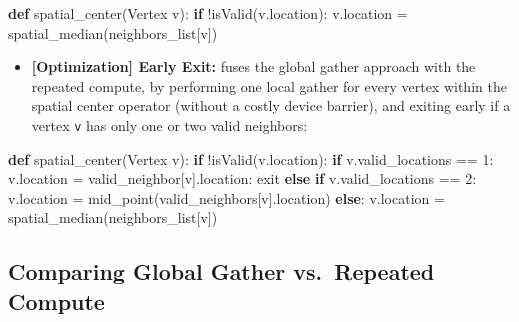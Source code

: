 \documentclass[10pt,oneside]{memoir}
\newenvironment{Shaded}{}{}
\newcommand{\ControlFlowTok}[1]{\textcolor[rgb]{0.00,0.44,0.13}{\textbf{#1}}}
\newcommand{\DecValTok}[1]{\textcolor[rgb]{0.25,0.63,0.44}{#1}}
\newcommand{\KeywordTok}[1]{\textcolor[rgb]{0.00,0.44,0.13}{\textbf{#1}}}
\newcommand{\NormalTok}[1]{#1}
\newcommand{\OperatorTok}[1]{\textcolor[rgb]{0.40,0.40,0.40}{#1}}
\providecommand{\tightlist}{%
  \setlength{\itemsep}{0pt}\setlength{\parskip}{0pt}}
\begin{document}
\begin{Shaded}
\begin{Highlighting}[]
\KeywordTok{def}\NormalTok{ spatial_center(Vertex v):}
    \ControlFlowTok{if} \OperatorTok{!}\NormalTok{isValid(v.location):}
\NormalTok{        v.location }\OperatorTok{=}\NormalTok{ spatial_median(neighbors_list[v])}
\end{Highlighting}
\end{Shaded}

\begin{itemize}
\tightlist
\item
  \textbf{{[}Optimization{]} Early Exit:} fuses the global gather
  approach with the repeated compute, by performing one local gather for
  every vertex within the spatial center operator (without a costly
  device barrier), and exiting early if a vertex \texttt{v} has only one
  or two valid neighbors:
\end{itemize}

\begin{Shaded}
\begin{Highlighting}[]
\KeywordTok{def}\NormalTok{ spatial_center(Vertex v):}
    \ControlFlowTok{if} \OperatorTok{!}\NormalTok{isValid(v.location):}
        \ControlFlowTok{if}\NormalTok{ v.valid_locations }\OperatorTok{==} \DecValTok{1}\NormalTok{:}
\NormalTok{            v.location }\OperatorTok{=}\NormalTok{ valid_neighbor[v].location:}
\NormalTok{            exit}
        \ControlFlowTok{else} \ControlFlowTok{if}\NormalTok{ v.valid_locations }\OperatorTok{==} \DecValTok{2}\NormalTok{:}
\NormalTok{            v.location }\OperatorTok{=}\NormalTok{ mid_point(valid_neighbors[v].location)}
        \ControlFlowTok{else}\NormalTok{:}
\NormalTok{            v.location }\OperatorTok{=}\NormalTok{ spatial_median(neighbors_list[v])}
\end{Highlighting}
\end{Shaded}

\hypertarget{comparing-global-gather-vs.repeated-compute}{%
\subsection{Comparing Global Gather vs.~Repeated
Compute}\label{comparing-global-gather-vs.repeated-compute}}
\end{document}
